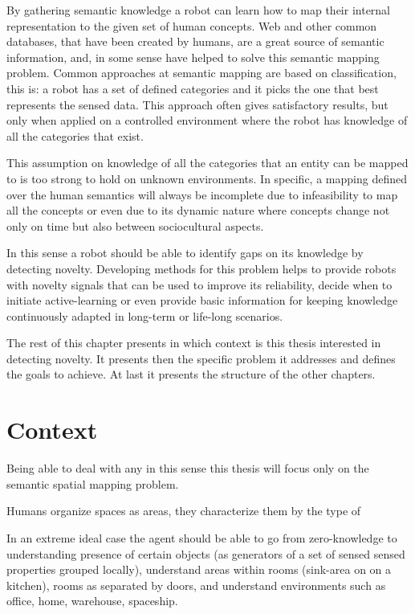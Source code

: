 By gathering semantic knowledge a robot can learn how to map their internal representation to the
given set of human concepts. Web and other common databases, that have been created by humans, are a
great source of semantic information, and, in some sense have helped to solve this semantic mapping
problem.
Common approaches at semantic mapping are based on classification, this is: a robot has a set of
defined categories and it picks the one that best represents the sensed data. This approach often
gives satisfactory results, but only when applied on a controlled environment where the robot has
knowledge of all the categories that exist.

This assumption on knowledge of all the categories that an entity can be mapped to is too strong
to hold on unknown environments. In specific, a mapping defined over the human semantics will always
be incomplete due to infeasibility to map all the concepts or even due to its dynamic nature where
concepts change not only on time but also between sociocultural aspects.

In this sense a robot should be able to identify gaps on its knowledge by detecting novelty.
Developing methods for this problem helps to provide robots with novelty signals that can be
used to improve its reliability, decide when to initiate active-learning or even provide basic
information for keeping knowledge continuously adapted in long-term or life-long scenarios.

The rest of this chapter presents in which context is this thesis interested in detecting novelty.
It presents then the specific problem it addresses and defines the goals to achieve.
At last it presents the structure of the other chapters.

\section{Context}

Being able to deal with any 
in this sense this thesis will focus only on the semantic spatial mapping problem.

Humans organize spaces as areas, they characterize them by the type of 

In an extreme ideal case the agent should be able to go from zero-knowledge to
understanding presence of certain objects (as generators of a set of sensed
sensed properties grouped locally), understand areas within rooms (sink-area on
on a kitchen), rooms as separated by doors, and understand environments such
as office, home, warehouse, spaceship.

